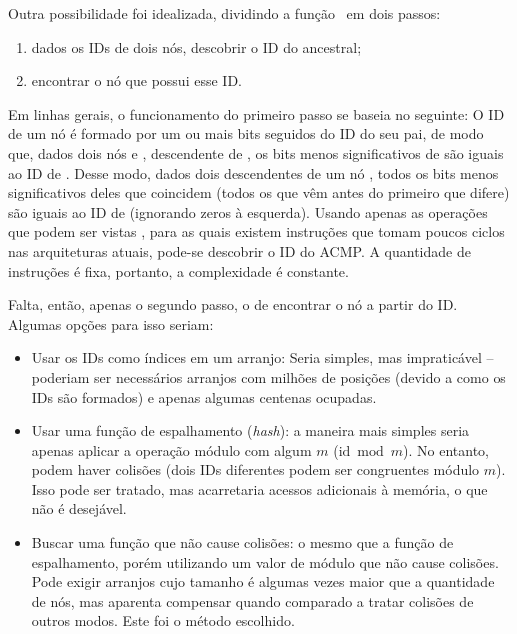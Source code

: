 Outra possibilidade foi idealizada, dividindo a função \ACMPIDs\ em dois passos:
\begin{enumerate}
	\item dados os IDs de dois nós, descobrir o ID do ancestral;
	\item encontrar o nó que possui esse ID.
\end{enumerate}
Em linhas gerais, o funcionamento do primeiro passo se baseia no seguinte:
O ID de um nó é formado por um ou mais bits seguidos do ID do seu pai, de modo que, dados dois nós  e ,  descendente de ,
os bits menos significativos de  são iguais ao ID de .
Desse modo, dados dois descendentes de um nó , todos os bits menos significativos deles que coincidem
(todos os que vêm antes do primeiro que difere) são iguais ao ID de  (ignorando zeros à esquerda).
Usando apenas as operações que podem ser vistas ,
para as quais existem instruções que tomam poucos ciclos nas arquiteturas atuais, pode-se descobrir o ID do ACMP.
A quantidade de instruções é fixa, portanto, a complexidade é constante.



Falta, então, apenas o segundo passo, o de encontrar o nó a partir do ID.
Algumas opções para isso seriam:
\begin{itemize}
	\item Usar os IDs como índices em um arranjo: Seria simples, mas impraticável -- poderiam ser necessários arranjos com milhões de posições (devido a como os IDs são formados) e apenas algumas centenas ocupadas.
	\item Usar uma função de espalhamento (\textit{hash}): a maneira mais simples seria apenas aplicar a operação módulo com algum $m$ ($\mathrm{id} \bmod m$).
	No entanto, podem haver colisões (dois IDs diferentes podem ser congruentes módulo $m$).
	Isso pode ser tratado, mas acarretaria acessos adicionais à memória, o que não é desejável.
	\item Buscar uma função que não cause colisões: o mesmo que a função de espalhamento, porém utilizando um valor de módulo que não cause colisões.
	Pode exigir arranjos cujo tamanho é algumas vezes maior que a quantidade de nós, mas aparenta compensar quando comparado a tratar colisões de outros modos.
	Este foi o método escolhido.
\end{itemize}

